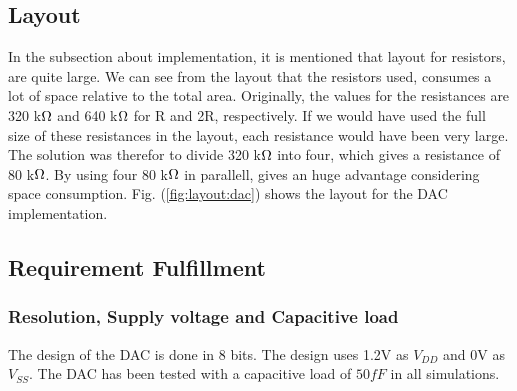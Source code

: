\documentclass[english, 12pt, a4paper]{ifimaster}
\begin{document}
\subsection{Layout}
In the subsection about implementation, it is mentioned that layout for resistors, are quite 
large. We can see from the layout that the resistors used, consumes a lot of space relative to the total area. Originally, the values for the resistances are
320 k\(\ohm\) and 640 k\(\ohm\) for R and 2R, respectively. If we would have used the full size of these resistances in the layout, each resistance would have been
very large. The solution was therefor to divide 320 k\(\ohm\) into four, which gives a resistance of 80 k\(\ohm\). By using four 80 k\(\ohm\) in parallell, gives an huge
advantage considering space consumption. Fig. (\ref{fig:layout:dac}) shows the layout for the DAC implementation.

\subsection{Requirement Fulfillment}

\subsubsection{Resolution, Supply voltage and Capacitive load}
The design of the DAC is done in 8 bits. The design uses 1.2V as \(V_{DD}\) and 0V as \(V_{SS}\).
The DAC has been tested with a capacitive load of \(50fF\) in all simulations.
\end{document}
